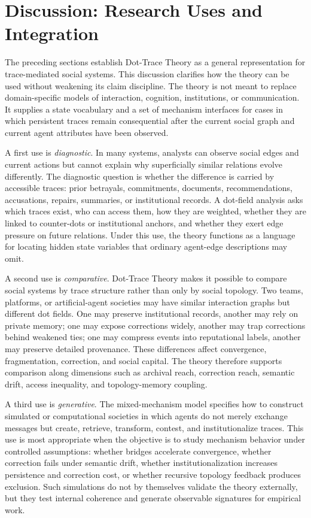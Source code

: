 \documentclass[11pt]{article}
\theoremstyle{remark}
\begin{document}
\section{Discussion: Research Uses and Integration}\label{discussion-research-uses-integration}

The preceding sections establish Dot-Trace Theory as a general representation for trace-mediated social systems. This discussion clarifies how the theory can be used without weakening its claim discipline. The theory is not meant to replace domain-specific models of interaction, cognition, institutions, or communication. It supplies a state vocabulary and a set of mechanism interfaces for cases in which persistent traces remain consequential after the current social graph and current agent attributes have been observed.

A first use is \emph{diagnostic}. In many systems, analysts can observe social edges and current actions but cannot explain why superficially similar relations evolve differently. The diagnostic question is whether the difference is carried by accessible traces: prior betrayals, commitments, documents, recommendations, accusations, repairs, summaries, or institutional records. A dot-field analysis asks which traces exist, who can access them, how they are weighted, whether they are linked to counter-dots or institutional anchors, and whether they exert edge pressure on future relations. Under this use, the theory functions as a language for locating hidden state variables that ordinary agent-edge descriptions may omit.

A second use is \emph{comparative}. Dot-Trace Theory makes it possible to compare social systems by trace structure rather than only by social topology. Two teams, platforms, or artificial-agent societies may have similar interaction graphs but different dot fields. One may preserve institutional records, another may rely on private memory; one may expose corrections widely, another may trap corrections behind weakened ties; one may compress events into reputational labels, another may preserve detailed provenance. These differences affect convergence, fragmentation, correction, and social capital. The theory therefore supports comparison along dimensions such as archival reach, correction reach, semantic drift, access inequality, and topology-memory coupling.

A third use is \emph{generative}. The mixed-mechanism model specifies how to construct simulated or computational societies in which agents do not merely exchange messages but create, retrieve, transform, contest, and institutionalize traces. This use is most appropriate when the objective is to study mechanism behavior under controlled assumptions: whether bridges accelerate convergence, whether correction fails under semantic drift, whether institutionalization increases persistence and correction cost, or whether recursive topology feedback produces exclusion. Such simulations do not by themselves validate the theory externally, but they test internal coherence and generate observable signatures for empirical work.
\end{document}
